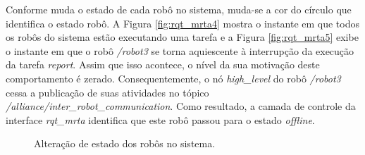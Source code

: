             Conforme muda o estado de cada robô no sistema, muda-se a cor do círculo que identifica o estado robô. A Figura \ref{fig:rqt_mrta4} mostra o instante em que todos os robôs do sistema estão executando uma tarefa e a Figura \ref{fig:rqt_mrta5} exibe o instante em que o robô \textit{/robot3} se torna aquiescente à interrupção da execução da tarefa \textit{report}. Assim que isso acontece, o nível da sua motivação deste comportamento é zerado. Consequentemente, o nó \textit{high\_level} do robô \textit{/robot3} cessa a publicação de suas atividades no tópico \textit{/alliance/inter\_robot\_communication}. Como resultado, a camada de controle da interface \textit{rqt\_mrta} identifica que este robô passou para o estado \textit{offline}.
            
            \begin{figure}[htb]
                \centering
                
                \caption{Alteração de estado dos robôs no sistema.} \label{fig:rqt_mrta_state_change}
            \end{figure}
            
